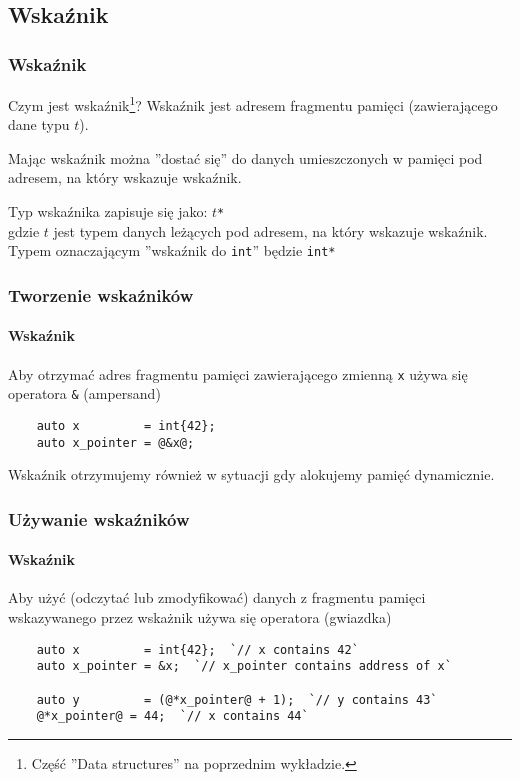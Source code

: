 \documentclass[aspectratio=169]{beamer}
\begin{document}
\subsection{Wskaźnik}

\begin{frame}
    \frametitle{Wskaźnik}

    Czym jest wskaźnik\footnote{Część ''Data structures'' na poprzednim
    wykładzie.}? Wskaźnik jest adresem fragmentu pamięci (zawierającego dane
    typu $t$).
    \label{what_is_a_pointer}

    \vspace{1em}

    Mając wskaźnik można ''dostać się'' do danych umieszczonych w pamięci pod
    adresem, na który wskazuje wskaźnik.

    \vspace{1em}

    Typ wskaźnika zapisuje się jako: {\tt $t$*}\\gdzie $t$ jest typem danych
    leżących pod adresem, na który wskazuje wskaźnik.\\
    Typem oznaczającym ''wskaźnik do {\tt int}'' będzie {\tt int*}
\end{frame}

\begin{frame}[fragile]
    \frametitle{Tworzenie wskaźników}
    \framesubtitle{Wskaźnik}

    Aby otrzymać adres fragmentu pamięci zawierającego zmienną {\tt x} używa się
    operatora {\tt \&} (ampersand)

    \begin{lstlisting}
    auto x         = int{42};
    auto x_pointer = @&x@;
    \end{lstlisting}
    \vspace{2.5em}

    Wskaźnik otrzymujemy również w sytuacji gdy alokujemy pamięć dynamicznie.
\end{frame}

\begin{frame}[fragile]
    \frametitle{Używanie wskaźników}
    \framesubtitle{Wskaźnik}

    Aby użyć (odczytać lub zmodyfikować) danych z fragmentu pamięci wskazywanego
    przez wskażnik używa się operatora {\tt *} (gwiazdka)

    \begin{lstlisting}
    auto x         = int{42};  `// x contains 42`
    auto x_pointer = &x;  `// x_pointer contains address of x`

    auto y         = (@*x_pointer@ + 1);  `// y contains 43`
    @*x_pointer@ = 44;  `// x contains 44`
    \end{lstlisting}
\end{frame}
\end{document}
